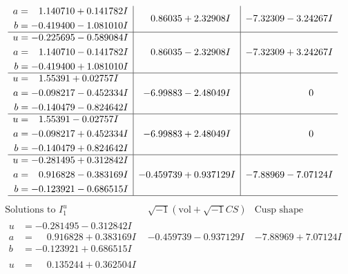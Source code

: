 \documentclass[1p]{elsarticle_modified}
\theoremstyle{definition}
\newcommand{\I}{\sqrt{-1}}
\begin{document}
$$\begin{array}{c|c|c}
\begin{aligned}
a &= \phantom{-}1.140710 + 0.141782 I \\
b &= -0.419400 - 1.081010 I\end{aligned}
 & \phantom{-}0.86035 + 2.32908 I & -7.32309 - 3.24267 I \\ \hline\begin{aligned}
u &= -0.225695 - 0.589084 I \\
a &= \phantom{-}1.140710 - 0.141782 I \\
b &= -0.419400 + 1.081010 I\end{aligned}
 & \phantom{-}0.86035 - 2.32908 I & -7.32309 + 3.24267 I \\ \hline\begin{aligned}
u &= \phantom{-}1.55391 + 0.02757 I \\
a &= -0.098217 - 0.452334 I \\
b &= -0.140479 - 0.824642 I\end{aligned}
 & -6.99883 - 2.48049 I & \phantom{-0.000000 } 0 \\ \hline\begin{aligned}
u &= \phantom{-}1.55391 - 0.02757 I \\
a &= -0.098217 + 0.452334 I \\
b &= -0.140479 + 0.824642 I\end{aligned}
 & -6.99883 + 2.48049 I & \phantom{-0.000000 } 0 \\ \hline\begin{aligned}
u &= -0.281495 + 0.312842 I \\
a &= \phantom{-}0.916828 - 0.383169 I \\
b &= -0.123921 - 0.686515 I\end{aligned}
 & -0.459739 + 0.937129 I & -7.88969 - 7.07124 I\\
 \hline 
 \end{array}$$\newpage$$\begin{array}{c|c|c}  
\text{Solutions to }I^u_{1}& \I (\text{vol} + \sqrt{-1}CS) & \text{Cusp shape}\\
 \hline 
\begin{aligned}
u &= -0.281495 - 0.312842 I \\
a &= \phantom{-}0.916828 + 0.383169 I \\
b &= -0.123921 + 0.686515 I\end{aligned}
 & -0.459739 - 0.937129 I & -7.88969 + 7.07124 I \\ \hline\begin{aligned}
u &= \phantom{-}0.135244 + 0.362504 I \\

\end{aligned}
\end{array}$$
\end{document}
